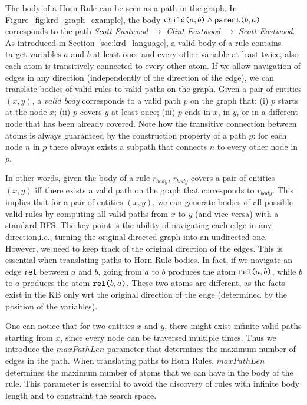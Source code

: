 The body of a Horn Rule can be seen as a path in the graph. In Figure~\ref{fig:krd_graph_example}, the body $\texttt{child(}a,b\texttt{)} \wedge \texttt{parent(}b,a\texttt{)}$ corresponds to the path \textit{Scott Eastwood} $\rightarrow$ \textit{Clint Eastwood} $\rightarrow$ \textit{Scott Eastwood}. 
As introduced in Section~\ref{sec:krd_language}, a valid body of a rule contains target variables $a$ and $b$ at least once and every other variable at least twice, also each atom is transitively connected to every other atom. 
If we allow navigation of edges in any direction (independently of the direction of the edge), we can translate bodies of valid rules to valid paths on the graph.
Given a pair of entities $(x,y)$, a {\em valid body} corresponds to a valid path $p$ on the graph that:
(i) $p$ starts at the node $x$;
(ii) $p$ covers $y$ at least once;
(iii) $p$ ends in $x$, in $y$, or in a different node that has been already covered.
Note how the transitive connection between atoms is always guaranteed by the construction property of a path $p$: for each node $n$ in $p$ there always exists a subpath that connects $n$ to every other node in $p$.

In other words, given the body of a rule $r_{body}$, $r_{body}$ covers a pair of entities $(x,y)$ iff there exists a valid path on the graph that corresponds to $r_{body}$. This implies that for a pair of entities $(x,y)$, we can generate bodies of all possible valid rules by computing all valid paths from $x$ to $y$ (and vice versa) with a standard BFS. The key point is the ability of navigating each edge in any direction,i.e., turning the original directed graph into an undirected one.
However, we need to keep track of the original direction of the edges. This is essential when translating paths to Horn Rule bodies. In fact, if we navigate an edge \texttt{rel} between $a$ and $b$, going from $a$ to $b$ produces the atom $\texttt{rel(}a,b\texttt{)}$, while $b$ to $a$ produces the atom $\texttt{rel(}b,a\texttt{)}$. These two atoms are different, as the facts exist in the KB only wrt the original direction of the edge (determined by the position of the variables).

One can notice that for two entities $x$ and $y$, there might exist infinite valid paths starting from $x$, since every node can be traversed multiple times. Thus we introduce the $maxPathLen$ parameter that determines the maximum number of edges in the path. When translating paths to Horn Rules, $maxPathLen$ determines the maximum number of atoms that we can have in the body of the rule. This parameter is essential to avoid the discovery of rules with infinite body length and to constraint the search space.

